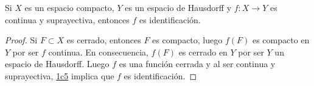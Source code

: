 

\begin{theorem}
Si $X$ es un espacio compacto, $Y$ es un espacio de Hausdorff y $f : X \longrightarrow Y$ es continua y suprayectiva, entonces $f$ es identificación.
\end{theorem}

\begin{proof}
Si $F \subset X$ es cerrado, entonces $F$ es compacto, luego $f(F)$ es compacto en $Y$ por ser $f$ continua. En consecuencia, $f(F)$ es cerrado en $Y$ por ser $Y$ un espacio de Hausdorff. Luego $f$ es una función cerrada y al ser continua y suprayectiva, \hyperref[card:1c5]{\textsf{1c5}} implica que $f$ es identificación.
\end{proof}
